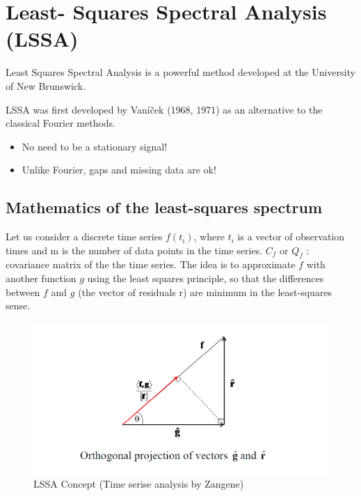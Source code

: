 \documentclass[12pt]{article}
\begin{document}
\section{Least- Squares Spectral Analysis (LSSA)}
Least Squares Spectral Analysis is a powerful method developed at
the University of New Brunswick.

LSSA was first developed by Vaníček (1968, 1971) as an alternative to
the classical Fourier methods.

\begin{itemize}
\item No need to be a stationary signal!
\item Unlike Fourier, gaps and missing data are ok!
\end{itemize}
\subsection{Mathematics of the least-squares spectrum}

Let us consider a discrete time series $f(t_i)$, where $t_i$ is a vector of
observation times and m is the number of data points in the time series. $C_f$ or $Q_f$ : covariance matrix of the the time series. The idea is to approximate $f$ with another function $g$ using the least squares
principle, so that the differences between $f$ and $g$ (the vector of residuals r)
are minimum in the least-squares sense.


\begin{figure}[h!]
    \centering
    \includegraphics[width=1\linewidth]{img/LSSA}
    \caption{LSSA Concept (Time serise analysis by Zangene)}
    \label{fig:dynamicprogramming}
\end{figure}
\end{document}

